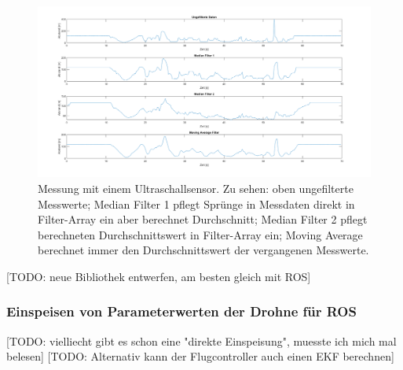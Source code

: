 \begin{figure}[!h]
	\includegraphics[width=\linewidth]{images/ultrasonic_cmp_filter.png}
	\caption{Messung mit einem Ultraschallsensor. Zu sehen: oben ungefilterte Messwerte; Median Filter 1 pflegt Sprünge in Messdaten direkt in Filter-Array ein aber berechnet Durchschnitt; Median Filter 2 pflegt berechneten Durchschnittswert in Filter-Array ein; Moving Average berechnet immer den Durchschnittswert der vergangenen Messwerte.}
	\label{fig:ultrasonic_filters}
  \end{figure} 

[TODO: neue Bibliothek entwerfen, am besten gleich mit ROS]

\subsubsection{Einspeisen von Parameterwerten der Drohne für ROS}

[TODO: vielliecht gibt es schon eine "direkte Einspeisung", muesste ich mich mal belesen]
[TODO: Alternativ kann der Flugcontroller auch einen EKF berechnen]
